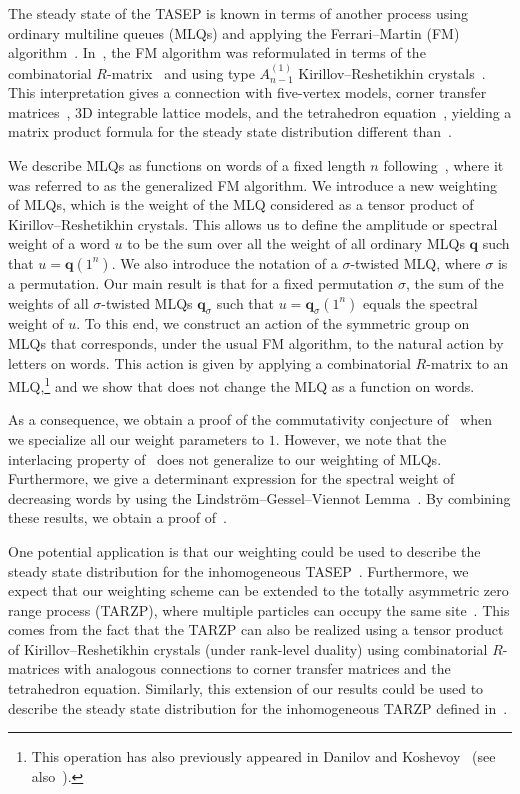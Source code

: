 \documentclass[reqno]{amsart}
\newcommand{\0}{\phantom{c}}
\newcommand{\qq}{\mathbf{q}}
\theoremstyle{plain}
\theoremstyle{definition}
\numberwithin{equation}{section}
\begin{document}
The steady state of the TASEP is known in terms of another process using ordinary multiline queues (MLQs) and applying the Ferrari--Martin (FM) algorithm~\cite{FM06}.
In~\cite{KMO15,KMO16}, the FM algorithm was reformulated in terms of the combinatorial $R$-matrix~\cite{NY97,Shimozono02} and using type $A_{n-1}^{(1)}$ Kirillov--Reshetikhin crystals~\cite{KKMMNN92}.
This interpretation gives a connection with five-vertex models, corner transfer matrices~\cite{Baxter89}, 3D integrable lattice models, and the tetrahedron equation~\cite{Zam80}, yielding a matrix product formula for the steady state distribution different than~\cite{CdGW15,EFM09,PEM09}.

We describe MLQs as functions on words of a fixed length $n$ following~\cite{AAMP}, where it was referred to as the generalized FM algorithm.
We introduce a new weighting of MLQs, which is the weight of the MLQ considered as a tensor product of Kirillov--Reshetikhin crystals.
This allows us to define the amplitude or spectral weight of a word $u$ to be the sum over all the weight of all ordinary MLQs $\qq$ such that $u = \qq(1^n)$.
We also introduce the notation of a $\sigma$-twisted MLQ, where $\sigma$ is a permutation.
Our main result is that for a fixed permutation $\sigma$, the sum of the weights of all $\sigma$-twisted MLQs $\qq_{\sigma}$ such that $u = \qq_{\sigma}(1^n)$ equals the spectral weight of $u$.
To this end, we construct an action of the symmetric group on MLQs that corresponds, under the usual FM algorithm, to the natural action by letters on words.
This action is given by applying a combinatorial $R$-matrix to an MLQ,\footnote{This operation has also previously appeared in Danilov and Koshevoy~\cite{DanilovKoshevoy} (see also~\cite[Ch.~4]{Gorodentsev2}).} and we show that does not change the MLQ as a function on words.

As a consequence, we obtain a proof of the commutativity conjecture of~\cite{AAMP} when we specialize all our weight parameters to $1$.
However, we note that the interlacing property of~\cite{AAMP} does not generalize to our weighting of MLQs.
Furthermore, we give a determinant expression for the spectral weight of decreasing words by using the Lindstr\"om--Gessel--Viennot Lemma~\cite{GV85,Lindstrom73}.
By combining these results, we obtain a proof of~\cite[Conj.~3.10]{AasLin17}.

One potential application is that our weighting could be used to describe the steady state distribution for the inhomogeneous TASEP~\cite{AM13,AL14}.
Furthermore, we expect that our weighting scheme can be extended to the totally asymmetric zero range process (TARZP), where multiple particles can occupy the same site~\cite{KMO16TARZP,KMO16TARZPII}.
This comes from the fact that the TARZP can also be realized using a tensor product of Kirillov--Reshetikhin crystals (under rank-level duality) using combinatorial $R$-matrices with analogous connections to corner transfer matrices and the tetrahedron equation.
Similarly, this extension of our results could be used to describe the steady state distribution for the inhomogeneous TARZP defined in~\cite{KMO16II}.
\end{document}
